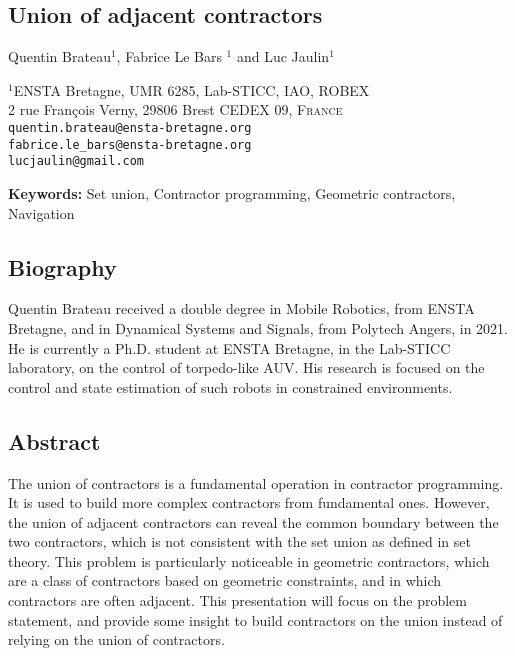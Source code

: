 \documentclass[14pt, a4paper]{article}
\newcommand\authors{Quentin Brateau$^{1}$, Fabrice Le Bars $^{1}$ and Luc Jaulin$^{1}$}
\newcommand\papertitle{Union of adjacent contractors}
\begin{document}
	\begin{center}

	\section*{\papertitle}
	\vspace*{0.8cm}
	{\large \authors}

	\bigskip

	{
		\small $^{1}$ENSTA Bretagne, UMR 6285, Lab-STICC, IAO, ROBEX\\
		2 rue François Verny, 29806 Brest CEDEX 09, \textsc{France} \\
		\medskip
		\texttt{quentin.brateau@ensta-bretagne.org}\\
		\texttt{fabrice.le\_bars@ensta-bretagne.org}\\
		\texttt{lucjaulin@gmail.com}\\
	}

	\end{center}

	\bigskip

	{\noindent\bf Keywords:} Set union, Contractor programming, Geometric contractors, Navigation

	\subsection*{Biography}

	Quentin Brateau received a double degree in Mobile Robotics, from ENSTA Bretagne, and in Dynamical Systems and Signals, from Polytech Angers, in 2021. He is currently a Ph.D. student at ENSTA Bretagne, in the Lab-STICC laboratory, on the control of torpedo-like AUV. His research is focused on the control and state estimation of such robots in constrained environments.

	\subsection*{Abstract}

	The union of contractors is a fundamental operation in contractor programming. It is used to build more complex contractors from fundamental ones. However, the union of adjacent contractors can reveal the common boundary between the two contractors, which is not consistent with the set union as defined in set theory. This problem is particularly noticeable in geometric contractors, which are a class of contractors based on geometric constraints, and in which contractors are often adjacent. This presentation will focus on the problem statement, and provide some insight to build contractors on the union instead of relying on the union of contractors.
\end{document}
